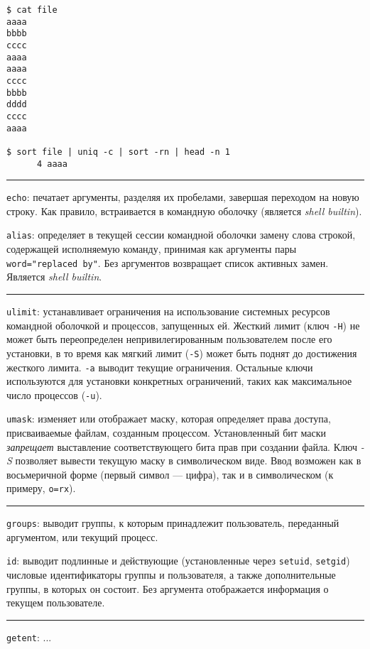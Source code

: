 \documentclass[listings]{labreport}
\begin{document}
\begin{verbatim}
$ cat file
aaaa
bbbb
cccc
aaaa
aaaa
cccc
bbbb
dddd
cccc
aaaa

$ sort file | uniq -c | sort -rn | head -n 1
      4 aaaa
\end{verbatim}

\noindent\rule{\textwidth}{1pt}

\texttt{echo}: печатает аргументы, разделяя их пробелами, завершая переходом на новую строку. Как
правило, встраивается в командную оболочку (является \textit{shell builtin}).

\texttt{alias}: определяет в текущей сессии командной оболочки замену слова строкой, содержащей
исполняемую команду, принимая как аргументы пары \texttt{word="replaced by"}. Без аргументов
возвращает список активных замен. Является \textit{shell builtin}.

\noindent\rule{\textwidth}{1pt}

\texttt{ulimit}: устанавливает ограничения на использование системных ресурсов командной оболочкой
и процессов, запущенных ей. Жесткий лимит (ключ \texttt{-H}) не может быть переопределен
непривилегированным пользователем после его установки, в то время как мягкий лимит (\texttt{-S})
может быть поднят до достижения жесткого лимита. \texttt{-a} выводит текущие ограничения.
Остальные ключи используются для установки конкретных ограничений, таких как максимальное
число процессов (\texttt{-u}).

\texttt{umask}: изменяет или отображает маску, которая определяет права доступа, присваиваемые файлам,
созданным процессом. Установленный бит маски \textit{запрещает} выставление соответствующего бита прав
при создании файла. Ключ \textit{-S} позволяет вывести текущую маску в символическом виде. Ввод
возможен как в восьмеричной форме (первый символ — цифра), так и в символическом (к примеру, \texttt{o=rx}).

\noindent\rule{\textwidth}{1pt}

\texttt{groups}: выводит группы, к которым принадлежит пользователь, переданный аргументом, или текущий процесс.

\texttt{id}: выводит подлинные и действующие (установленные через \texttt{setuid}, \texttt{setgid})
числовые идентификаторы группы и пользователя, а также дополнительные группы, в которых он состоит.
Без аргумента отображается информация о текущем пользователе.

\noindent\rule{\textwidth}{1pt}

\texttt{getent}: ...
\end{document}
